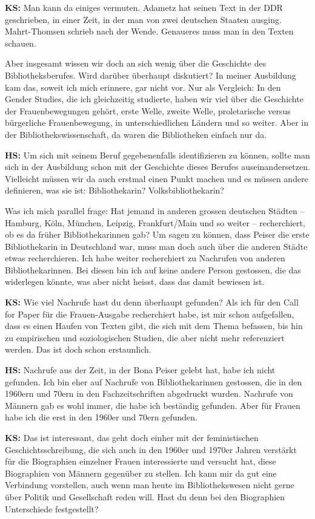 \documentclass[a4paper,
fontsize=11pt,
oneside,
numbers=noperiodatend,
parskip=half-,
bibliography=totoc,
final
]{scrartcl}
\begin{document}
\textbf{KS:} Man kann da einiges vermuten. Adametz hat seinen Text in
der DDR geschrieben, in einer Zeit, in der man von zwei deutschen
Staaten ausging. Mahrt-Thomsen schrieb nach der Wende. Genaueres muss
man in den Texten schauen.

Aber insgesamt wissen wir doch an sich wenig über die Geschichte des
Bibliotheksberufes. Wird darüber überhaupt diskutiert? In meiner
Ausbildung kam das, soweit ich mich erinnere, gar nicht vor. Nur als
Vergleich: In den Gender Studies, die ich gleichzeitig studierte, haben
wir viel über die Geschichte der Frauenbewegungen gehört, erste Welle,
zweite Welle, proletarische versus bürgerliche Frauenbewegung, in
unterschiedlichen Ländern und so weiter. Aber in der
Bibliothekswissenschaft, da waren die Bibliotheken einfach nur da.

\textbf{HS:} Um sich mit seinem Beruf gegebenenfalls identifizieren zu
können, sollte man sich in der Ausbildung schon mit der Geschichte
dieses Berufes auseinandersetzen. Vielleicht müssen wir da auch erstmal
einen Punkt machen und es müssen andere definieren, was sie ist:
Bibliothekarin? Volksbibliothekarin?

Was ich mich parallel frage: Hat jemand in anderen grossen deutschen
Städten -- Hamburg, Köln, München, Leipzig, Frankfurt/Main und so weiter
-- recherchiert, ob es da früher Bibliothekarinnen gab? Um sagen zu
können, dass Peiser die erste Bibliothekarin in Deutschland war, muss
man doch auch über die anderen Städte etwas recherchieren. Ich habe
weiter recherchiert zu Nachrufen von anderen Bibliothekarinnen. Bei
diesen bin ich auf keine andere Person gestossen, die das widerlegen
könnte, was aber nicht heisst, dass das damit bewiesen ist.

\textbf{KS:} Wie viel Nachrufe hast du denn überhaupt gefunden? Als ich
für den Call for Paper für die Frauen-Ausgabe recherchiert habe, ist mir
schon aufgefallen, dass es einen Haufen von Texten gibt, die sich mit
dem Thema befassen, bis hin zu empirischen und soziologischen Studien,
die aber nicht mehr referenziert werden. Das ist doch schon erstaunlich.

\textbf{HS:} Nachrufe aus der Zeit, in der Bona Peiser gelebt hat, habe
ich nicht gefunden. Ich bin eher auf Nachrufe von Bibliothekarinnen
gestossen, die in den 1960ern und 70ern in den Fachzeitschriften
abgedruckt wurden. Nachrufe von Männern gab es wohl immer, die habe ich
beständig gefunden. Aber für Frauen habe ich die erst in den 1960er und
70ern gefunden.

\textbf{KS:} Das ist interessant, das geht doch einher mit der
feministischen Geschichtsschreibung, die sich auch in den 1960er und
1970er Jahren verstärkt für die Biographien einzelner Frauen
interessierte und versucht hat, diese Biographien von Männern gegenüber
zu stellen. Ich kann mir da gut eine Verbindung vorstellen, auch wenn
man heute im Bibliothekswesen nicht gerne über Politik und Gesellschaft
reden will. Hast du denn bei den Biographien Unterschiede festgestellt?
\end{document}
